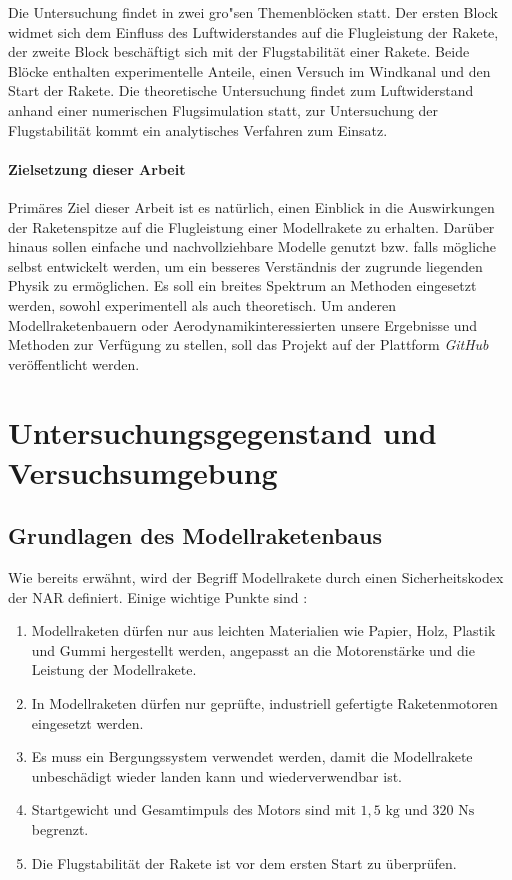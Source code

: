\documentclass[10pt,a4paper]{article}
\begin{document}
Die Untersuchung findet in zwei gro"sen Themenblöcken statt. Der ersten Block widmet sich dem Einfluss des Luftwiderstandes auf die Flugleistung der Rakete, der zweite Block beschäftigt sich mit der Flugstabilität einer Rakete. Beide Blöcke enthalten experimentelle Anteile, einen Versuch im Windkanal und den Start der Rakete. Die theoretische Untersuchung findet zum Luftwiderstand anhand einer numerischen Flugsimulation statt, zur Untersuchung der Flugstabilität kommt ein analytisches Verfahren zum Einsatz. 

\paragraph{Zielsetzung dieser Arbeit}
Primäres Ziel dieser Arbeit ist es natürlich, einen Einblick in die Auswirkungen der Raketenspitze auf die Flugleistung einer Modellrakete zu erhalten. Darüber hinaus sollen einfache und nachvollziehbare Modelle genutzt bzw. falls mögliche selbst entwickelt werden, um ein besseres Verständnis der zugrunde liegenden Physik zu ermöglichen. Es soll ein breites Spektrum an Methoden eingesetzt werden, sowohl experimentell als auch theoretisch. Um anderen Modellraketenbauern oder Aerodynamikinteressierten unsere Ergebnisse und Methoden zur Verfügung zu stellen, soll das Projekt auf der Plattform  \emph{GitHub} veröffentlicht werden.



\section{Untersuchungsgegenstand und Versuchsumgebung}

\subsection{Grundlagen des Modellraketenbaus}

Wie bereits erwähnt, wird der Begriff Modellrakete durch einen Sicherheitskodex der NAR definiert. Einige wichtige Punkte sind \cite{om}:
\begin{enumerate}
	\item Modellraketen dürfen nur aus leichten Materialien wie Papier, Holz, Plastik und Gummi hergestellt werden, angepasst an die Motorenstärke und die Leistung der Modellrakete.
	
	\item In Modellraketen dürfen nur geprüfte, industriell gefertigte Raketenmotoren eingesetzt werden. 
	
	\item Es muss ein Bergungssystem verwendet werden, damit die Modellrakete unbeschädigt wieder landen kann und wiederverwendbar ist.
	
	\item Startgewicht und Gesamtimpuls des Motors sind mit $1,5 \text{ kg}$ und $320 \text{ Ns}$ begrenzt.
	
	\item Die Flugstabilität der Rakete ist vor dem ersten Start zu überprüfen.
\end{enumerate}
\end{document}
